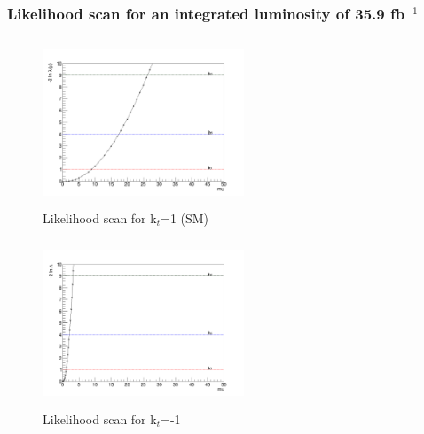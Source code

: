 \documentclass[11pt]{beamer}
\begin{document}
\begin{frame}
\frametitle{Likelihood scan for an integrated luminosity of 35.9 fb$^{-1}$}
\begin{minipage}{0.5\textwidth}
	\begin{center}
		\begin{figure}
			\includegraphics[width=6cm,height=5cm]{figures/Likelihood.png}
			\caption*{Likelihood scan for k$_t$=1 (SM)}
		\end{figure}
	\end{center}
\end{minipage}\hfill
\begin{minipage}{0.5\textwidth}
	\begin{center}
		\begin{figure}
			\includegraphics[width=6cm,height=5cm]{figures/kt-1/Likelihood-kt-1.png}
			\caption*{Likelihood scan for k$_t$=-1}
		\end{figure}
	\end{center}
\end{minipage}
\end{frame}
\end{document}
